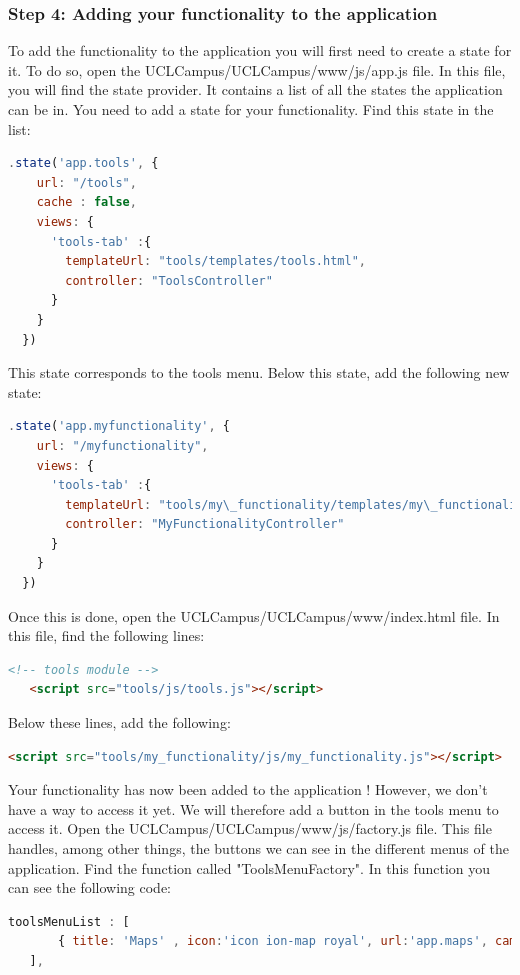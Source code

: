 \documentclass{eplmastersthesis}
\begin{document}
\subsubsection{Step 4: Adding your functionality to the application}
To add the functionality to the application you will first need to create a state for it. To do so, open the UCLCampus/UCLCampus/www/js/app.js file. In this file, you will find the state provider. It contains a list of all the states the application can be in. You need to add a state for your functionality. Find this state in the list:
\begin{lstlisting}[language=JavaScript]
.state('app.tools', {
    url: "/tools",
    cache : false,
    views: {
      'tools-tab' :{
        templateUrl: "tools/templates/tools.html",
        controller: "ToolsController"
      }
    }
  })
\end{lstlisting} 
This state corresponds to the tools menu. Below this state, add the following new state:
\begin{lstlisting}[language=JavaScript]
.state('app.myfunctionality', {
    url: "/myfunctionality",
    views: {
      'tools-tab' :{
        templateUrl: "tools/my\_functionality/templates/my\_functionality.html",
        controller: "MyFunctionalityController"
      }
    }
  })
\end{lstlisting} 
Once this is done, open the UCLCampus/UCLCampus/www/index.html file. In this file, find the following lines:
\begin{lstlisting}[language=HTML]
   <!-- tools module -->
   <script src="tools/js/tools.js"></script>
\end{lstlisting}
Below these lines, add the following:
\begin{lstlisting}[language=HTML]
   <script src="tools/my_functionality/js/my_functionality.js"></script>
\end{lstlisting}
Your functionality has now been added to the application ! However, we don't have a way to access it yet. We will therefore add a button in the tools menu to access it. Open the UCLCampus/UCLCampus/www/js/factory.js file. This file handles, among other things, the buttons we can see in the different menus of the application. Find the function called "ToolsMenuFactory".  In this function you can see the following code:
\begin{lstlisting}[language=JavaScript]
   toolsMenuList : [
       { title: 'Maps' , icon:'icon ion-map royal', url:'app.maps', campus:['Louvain-la-Neuve']}
   ], 
\end{lstlisting}
\end{document}
